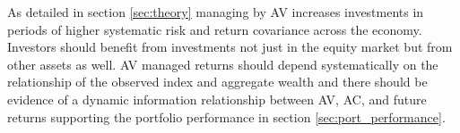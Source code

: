 

As detailed in section \ref{sec:theory} managing by AV increases investments in periods of higher systematic risk and return covariance across the economy. Investors should benefit from investments not just in the equity market but from other assets as well. AV managed returns should depend systematically on the relationship of the observed index and aggregate wealth and there should be evidence of a dynamic information relationship between AV, AC, and future returns supporting the portfolio performance in section \ref{sec:port_performance}. %